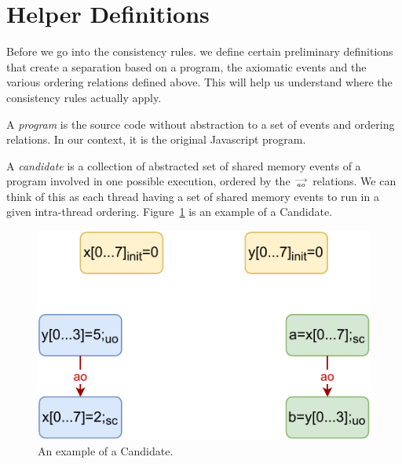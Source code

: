 \section{Helper Definitions}
    
    Before we go into the consistency rules. we define certain preliminary definitions that create a separation based on a program, the axiomatic events and the various ordering relations defined above. This will help us understand where the consistency rules actually apply.    
    
    \begin{definition}
        A \emph{program} is the source code without abstraction to a set of events and ordering relations. In our context, it is the original Javascript program. 
    
    \end{definition}
    
    \begin{definition}
        A \emph{candidate} is a collection of abstracted set of shared memory events of a program involved in one possible execution, ordered by the $\stackrel{\longrightarrow}{_\textit{ao}}$ relations. 
        We can think of this as each thread having a set of shared memory events to run in a given intra-thread ordering. 
        Figure~\ref{model:candidate} is an example of a Candidate.
        \begin{figure}[H]
            \centering
            \includegraphics[scale=0.7]{3.ECMAScriptMemoryModel/candidate.pdf}
            \caption{An example of a Candidate.}
            \label{model:candidate}
        \end{figure}
        
    \end{definition}

